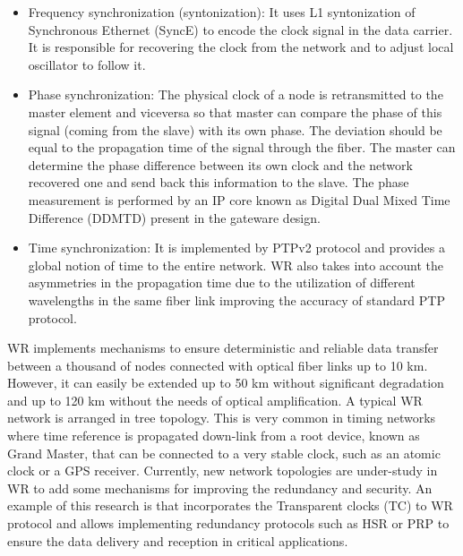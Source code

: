 \begin{itemize}
	\item {Frequency synchronization (syntonization): It uses L1 syntonization 
	of Synchronous Ethernet (SyncE) to encode the clock signal in the data 
	carrier. It is responsible for recovering the clock from the network and to 
	adjust local oscillator to follow it.}
	\item {Phase synchronization: The physical clock of a node is retransmitted to the master element and viceversa so that master can compare the phase of this signal (coming from the slave) with its own phase. The deviation should be equal to the propagation time of the signal through the fiber. The master can determine the phase difference between its own clock and the network recovered one and send back this information to the slave. The phase measurement is performed by an IP core known as Digital Dual Mixed Time Difference (DDMTD) present in the gateware design.}
	\item {Time synchronization: It is implemented by PTPv2 protocol and provides a global notion of time to the entire network. WR also takes into account the asymmetries in the propagation time due to the utilization of different wavelengths in the same fiber link improving the accuracy of standard PTP protocol.}
\end{itemize}


WR implements mechanisms to ensure deterministic and reliable data transfer 
between a thousand of nodes connected with  optical fiber links up to 10 km. 
However, it can easily be extended up to 50 km without significant degradation 
and up to 120 km without the needs of optical amplification. A typical WR 
network is arranged in tree topology. This is very common in timing networks 
where time reference is propagated down-link from a root device, known as Grand 
Master, that can be connected to a very stable clock, such as an atomic clock 
or a GPS receiver. Currently, new network topologies are under-study in WR to 
add some mechanisms for improving the redundancy and security. An example of 
this research is \cite{jlgutierrez-paper-redundancy} that incorporates the 
Transparent clocks (TC) to WR protocol and allows implementing redundancy 
protocols such as HSR or PRP to ensure the data delivery and reception in 
critical applications.

